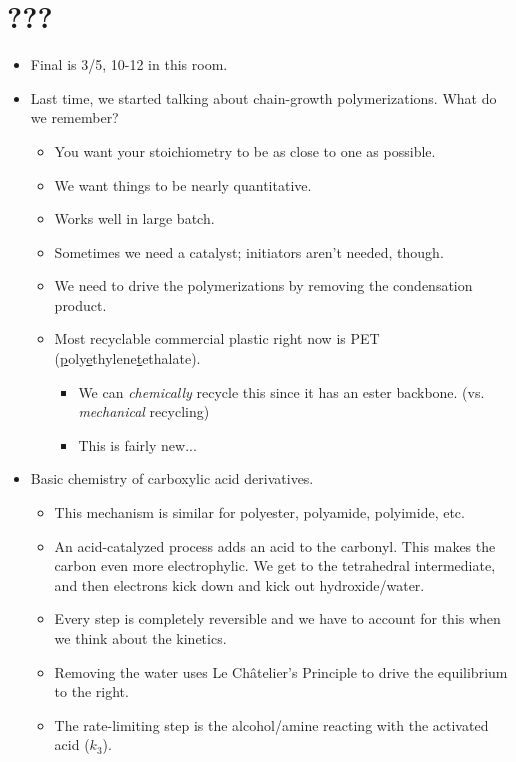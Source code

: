 \documentclass[../notes.tex]{subfiles}
\begin{document}
\section{???}
\begin{itemize}
    \item {}Final is 3/5, 10-12 in this room.
    \item Last time, we started talking about chain-growth polymerizations. What do we remember?
    \begin{itemize}
        \item You want your stoichiometry to be as close to one as possible.
        \item We want things to be nearly quantitative.
        \item Works well in large batch.
        \item Sometimes we need a catalyst; initiators aren't needed, though.
        \item We need to drive the polymerizations by removing the condensation product.
        \item Most recyclable commercial plastic right now is PET (\underline{p}oly\underline{e}thylene\underline{t}ethalate).
        \begin{itemize}
            \item We can \emph{chemically} recycle this since it has an ester backbone. (vs. \emph{mechanical} recycling)
            \item This is fairly new...
        \end{itemize}
    \end{itemize}
    \item Basic chemistry of carboxylic acid derivatives.
    \begin{itemize}
        \item This mechanism is similar for polyester, polyamide, polyimide, etc.
        \item An acid-catalyzed process adds an acid to the carbonyl. This makes the carbon even more electrophylic. We get to the tetrahedral intermediate, and then electrons kick down and kick out hydroxide/water.
        \item Every step is completely reversible and we have to account for this when we think about the kinetics.
        \item Removing the water uses Le Ch\^{a}telier's Principle to drive the equilibrium to the right.
        \item The rate-limiting step is the alcohol/amine reacting with the activated acid ($k_3$).

\end{itemize}
\end{itemize}
\end{document}
